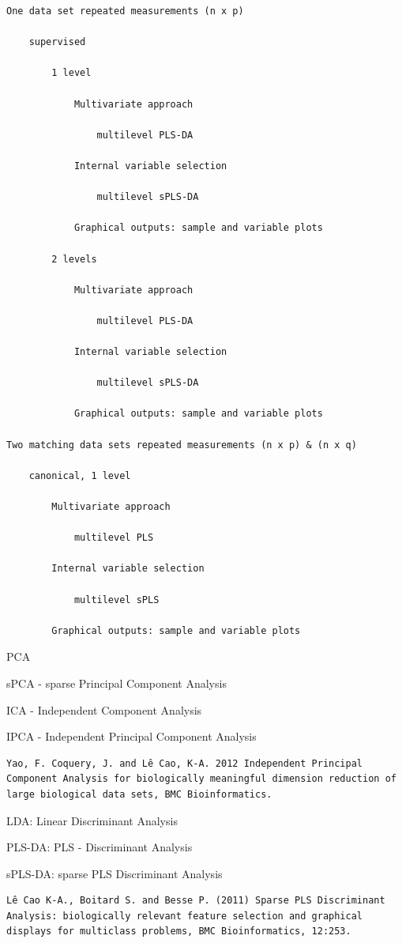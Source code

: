 \documentclass[
]{book}
\begin{document}
\begin{verbatim}
One data set repeated measurements (n x p)

    supervised

        1 level

            Multivariate approach

                multilevel PLS-DA

            Internal variable selection

                multilevel sPLS-DA

            Graphical outputs: sample and variable plots

        2 levels

            Multivariate approach

                multilevel PLS-DA

            Internal variable selection

                multilevel sPLS-DA

            Graphical outputs: sample and variable plots

Two matching data sets repeated measurements (n x p) & (n x q)

    canonical, 1 level

        Multivariate approach

            multilevel PLS

        Internal variable selection

            multilevel sPLS

        Graphical outputs: sample and variable plots
\end{verbatim}

PCA

sPCA - sparse Principal Component Analysis

ICA - Independent Component Analysis

IPCA - Independent Principal Component Analysis

\begin{verbatim}
Yao, F. Coquery, J. and Lê Cao, K-A. 2012 Independent Principal Component Analysis for biologically meaningful dimension reduction of large biological data sets, BMC Bioinformatics.
\end{verbatim}

LDA: Linear Discriminant Analysis

PLS-DA: PLS - Discriminant Analysis

sPLS-DA: sparse PLS Discriminant Analysis

\begin{verbatim}
Lê Cao K-A., Boitard S. and Besse P. (2011) Sparse PLS Discriminant Analysis: biologically relevant feature selection and graphical displays for multiclass problems, BMC Bioinformatics, 12:253.
\end{verbatim}
\end{document}
